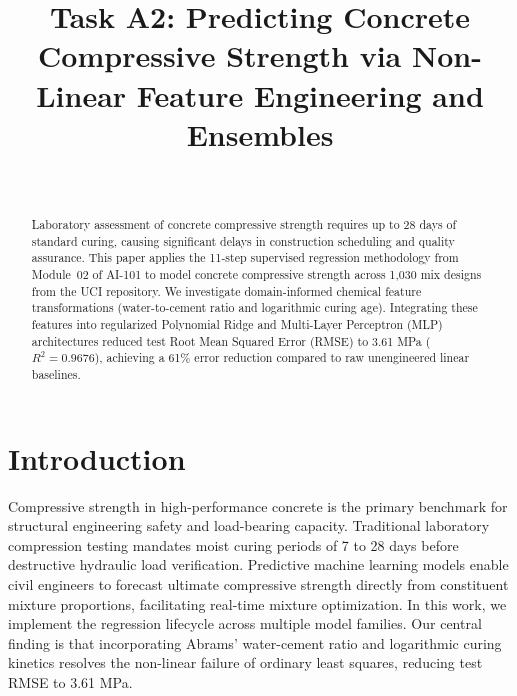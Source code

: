 \documentclass[10pt,journal,compsoc,twocolumn]{IEEEtran}
\begin{document}
\title{Task A2: Predicting Concrete Compressive Strength via Non-Linear Feature Engineering and Ensembles}

\author{
    \\
}

\maketitle

\begin{abstract}
Laboratory assessment of concrete compressive strength requires up to 28 days of standard curing, causing significant delays in construction scheduling and quality assurance. This paper applies the 11-step supervised regression methodology from Module~02 of AI-101 to model concrete compressive strength across 1,030 mix designs from the UCI repository. We investigate domain-informed chemical feature transformations (water-to-cement ratio and logarithmic curing age). Integrating these features into regularized Polynomial Ridge and Multi-Layer Perceptron (MLP) architectures reduced test Root Mean Squared Error (RMSE) to 3.61 MPa ($R^2 = 0.9676$), achieving a 61\% error reduction compared to raw unengineered linear baselines.
\end{abstract}

\section{Introduction}
Compressive strength in high-performance concrete is the primary benchmark for structural engineering safety and load-bearing capacity. Traditional laboratory compression testing mandates moist curing periods of 7 to 28 days before destructive hydraulic load verification. Predictive machine learning models enable civil engineers to forecast ultimate compressive strength directly from constituent mixture proportions, facilitating real-time mixture optimization. In this work, we implement the regression lifecycle across multiple model families. Our central finding is that incorporating Abrams' water-cement ratio and logarithmic curing kinetics resolves the non-linear failure of ordinary least squares, reducing test RMSE to 3.61 MPa.
\end{document}
